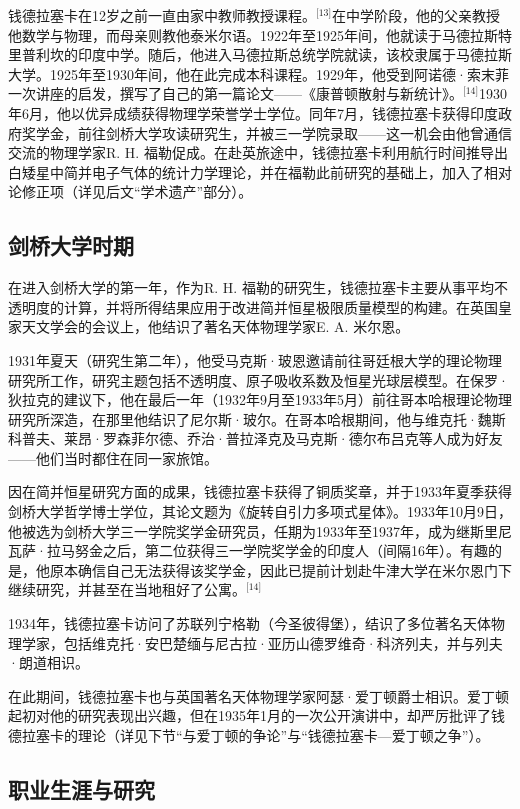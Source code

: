 钱德拉塞卡在12岁之前一直由家中教师教授课程。\(^\text{[13]}\)在中学阶段，他的父亲教授他数学与物理，而母亲则教他泰米尔语。1922年至1925年间，他就读于马德拉斯特里普利坎的印度中学。随后，他进入马德拉斯总统学院就读，该校隶属于马德拉斯大学。1925年至1930年间，他在此完成本科课程。1929年，他受到阿诺德·索末菲一次讲座的启发，撰写了自己的第一篇论文——《康普顿散射与新统计》。\(^\text{[14]}\)1930年6月，他以优异成绩获得物理学荣誉学士学位。同年7月，钱德拉塞卡获得印度政府奖学金，前往剑桥大学攻读研究生，并被三一学院录取——这一机会由他曾通信交流的物理学家R. H. 福勒促成。在赴英旅途中，钱德拉塞卡利用航行时间推导出白矮星中简并电子气体的统计力学理论，并在福勒此前研究的基础上，加入了相对论修正项（详见后文“学术遗产”部分）。
\subsection{剑桥大学时期}
在进入剑桥大学的第一年，作为R. H. 福勒的研究生，钱德拉塞卡主要从事平均不透明度的计算，并将所得结果应用于改进简并恒星极限质量模型的构建。在英国皇家天文学会的会议上，他结识了著名天体物理学家E. A. 米尔恩。

1931年夏天（研究生第二年），他受马克斯·玻恩邀请前往哥廷根大学的理论物理研究所工作，研究主题包括不透明度、原子吸收系数及恒星光球层模型。在保罗·狄拉克的建议下，他在最后一年（1932年9月至1933年5月）前往哥本哈根理论物理研究所深造，在那里他结识了尼尔斯·玻尔。在哥本哈根期间，他与维克托·魏斯科普夫、莱昂·罗森菲尔德、乔治·普拉泽克及马克斯·德尔布吕克等人成为好友——他们当时都住在同一家旅馆。

因在简并恒星研究方面的成果，钱德拉塞卡获得了铜质奖章，并于1933年夏季获得剑桥大学哲学博士学位，其论文题为《旋转自引力多项式星体》。1933年10月9日，他被选为剑桥大学三一学院奖学金研究员，任期为1933年至1937年，成为继斯里尼瓦萨·拉马努金之后，第二位获得三一学院奖学金的印度人（间隔16年）。有趣的是，他原本确信自己无法获得该奖学金，因此已提前计划赴牛津大学在米尔恩门下继续研究，并甚至在当地租好了公寓。\(^\text{[14]}\)

1934年，钱德拉塞卡访问了苏联列宁格勒（今圣彼得堡），结识了多位著名天体物理学家，包括维克托·安巴楚缅与尼古拉·亚历山德罗维奇·科济列夫，并与列夫·朗道相识。

在此期间，钱德拉塞卡也与英国著名天体物理学家阿瑟·爱丁顿爵士相识。爱丁顿起初对他的研究表现出兴趣，但在1935年1月的一次公开演讲中，却严厉批评了钱德拉塞卡的理论（详见下节“与爱丁顿的争论”与“钱德拉塞卡—爱丁顿之争”）。
\subsection{职业生涯与研究}
